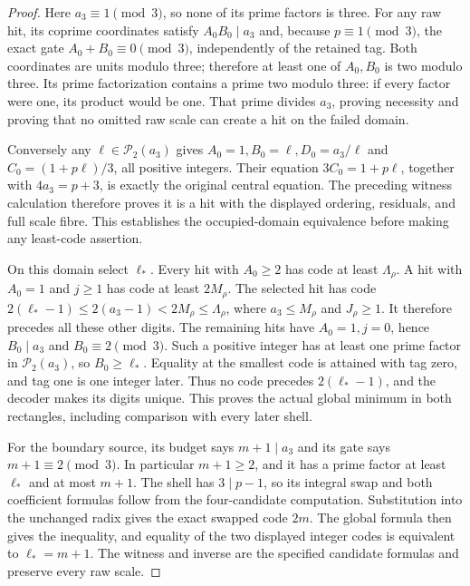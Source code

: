 \begin{proof}
Here \(a_3\equiv1\pmod3\), so none of its prime factors is
three. For any raw hit, its coprime coordinates satisfy
\(A_0B_0\mid a_3\) and, because \(p\equiv1\pmod3\),
the exact gate \(A_0+B_0\equiv0\pmod3\), independently
of the retained tag. Both coordinates are units modulo three;
therefore at least one of \(A_0,B_0\) is two modulo three.
Its prime factorization contains a prime two modulo three: if
every factor were one, its product would be one. That prime divides
\(a_3\), proving necessity and proving that no omitted raw scale
can create a hit on the failed domain.

Conversely any \(\ell\in\mathcal P_2(a_3)\) gives
\(A_0=1,B_0=\ell,D_0=a_3/\ell\) and
\(C_0=(1+p\ell)/3\), all positive integers. Their equation
\(3C_0=1+p\ell\), together with \(4a_3=p+3\), is exactly
the original central equation. The preceding witness calculation
therefore proves it is a hit with the displayed ordering, residuals,
and full scale fibre. This establishes the occupied-domain
equivalence before making any least-code assertion.

On this domain select \(\ell_*\). Every hit with \(A_0\ge2\)
has code at least \(\Lambda_\rho\). A hit with \(A_0=1\)
and \(j\ge1\) has code at least \(2M_\rho\). The selected
hit has code
\(2(\ell_*-1)\le2(a_3-1)<2M_\rho\le\Lambda_\rho\),
where \(a_3\le M_\rho\) and \(J_\rho\ge1\).
It therefore precedes all these other digits. The remaining hits
have \(A_0=1,j=0\), hence \(B_0\mid a_3\) and
\(B_0\equiv2\pmod3\). Such a positive integer has at least
one prime factor in \(\mathcal P_2(a_3)\), so
\(B_0\ge\ell_*\). Equality at the smallest code is attained
with tag zero, and tag one is one integer later. Thus no code
precedes \(2(\ell_*-1)\), and the decoder makes its digits
unique. This proves the actual global minimum in both rectangles,
including comparison with every later shell.

For the boundary source, its budget says \(m+1\mid a_3\)
and its gate says \(m+1\equiv2\pmod3\). In particular
\(m+1\ge2\), and it has a prime factor at least \(\ell_*\)
and at most \(m+1\). The shell has \(3\mid p-1\), so its
integral swap and both coefficient formulas follow from the
four-candidate computation. Substitution into the unchanged radix
gives the exact swapped code \(2m\). The global formula then
gives the inequality, and equality of the two displayed integer
codes is equivalent to \(\ell_*=m+1\). The witness and inverse
are the specified candidate formulas and preserve every raw scale.
\end{proof}

